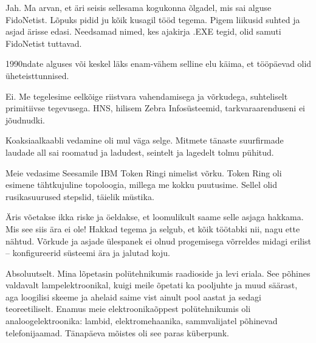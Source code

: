 
Jah. Ma arvan, et äri seisis sellesama kogukonna õlgadel, mis sai alguse FidoNetist. Lõpuks pidid ju kõik kusagil tööd tegema. Pigem liikusid
suhted ja asjad ärisse edasi. Needsamad nimed, kes ajakirja .EXE tegid, olid samuti FidoNetist tuttavad. 


1990ndate alguses või keskel läks enam-vähem selline elu käima, et tööpäevad olid üheteisttunnised. 


Ei. Me tegelesime eelkõige riistvara vahendamisega ja võrkudega, 
suhteliselt primitiivse tegevusega. HNS, hilisem Zebra 
Infosüsteemid, tarkvaraarenduseni ei jõudnudki.


Koaksiaalkaabli vedamine oli mul väga selge. Mitmete tänaste suurfirmade 
laudade all sai roomatud ja ladudest, seintelt ja lagedelt tolmu pühitud.


Meie vedasime Seesamile IBM Token Ringi 
nimelist võrku. Token Ring oli esimene tähtkujuline topoloogia, millega me kokku puutusime. Sellel 
olid rusikasuurused stepslid, täielik müstika.
 

Äris võetakse ikka riske ja öeldakse, et loomulikult saame selle asjaga hakkama. Mis see siis ära 
ei ole! Hakkad tegema ja selgub, et kõik töötabki nii, nagu ette nähtud.
Võrkude ja asjade ülespanek ei olnud progemisega võrreldes midagi
erilist -- konfigureerid süsteemi ära ja jalutad koju.


Absoluutselt. Mina lõpetasin polütehnikumis 
raadioside ja levi eriala. See põhines valdavalt lampelektroonikal, kuigi 
meile õpetati ka pooljuhte ja muud säärast, aga loogilisi skeeme ja
ahelaid saime vist ainult pool aastat ja sedagi 
teoreetiliselt. Enamus meie elektroonikaõppest polütehnikumis oli 
analoogelektroonika: lambid, elektromehaanika, sammvalijatel 
põhinevad telefonijaamad. Tänapäeva mõistes oli see paras küberpunk. 

